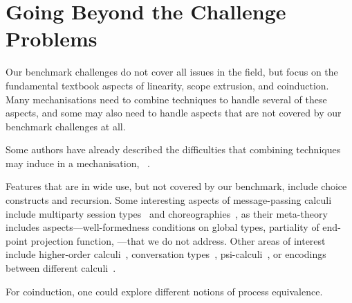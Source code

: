 \documentclass[runningheads]{llncs}
\begin{document}

\section{Going Beyond the Challenge Problems}\label{sec:going-beyond}
Our benchmark challenges do not cover all issues in the field, but focus on the fundamental textbook aspects of linearity, scope extrusion, and coinduction.
Many mechanisations need to combine techniques to handle several of these aspects, and some may also need to handle aspects that are not covered by our benchmark challenges at all.

Some authors have already described the difficulties that combining techniques may induce in a mechanisation, \eg~\cite{DBLP:conf/forte/ZalakainD21}.

Features that are in wide use, but not covered by our benchmark, include choice constructs and recursion.
Some interesting aspects of message-passing calculi include multiparty session types~\cite{10.1145/2827695} and choreographies~\cite{Carbone2013}, as their meta-theory includes aspects---\eg well-formedness conditions on global types, partiality of end-point projection function, \etc---that we do not address.
Other areas of interest include higher-order calculi~\cite{Hirsch2022}, conversation types~\cite{DBLP:journals/tcs/CairesV10}, psi-calculi~\cite{lmcs:696}, or encodings between different calculi~\cite{DBLP:journals/iandc/Gorla10,DBLP:journals/iandc/DardhaGS17}.

For coinduction, one could explore different notions of process equivalence.
\end{document}
